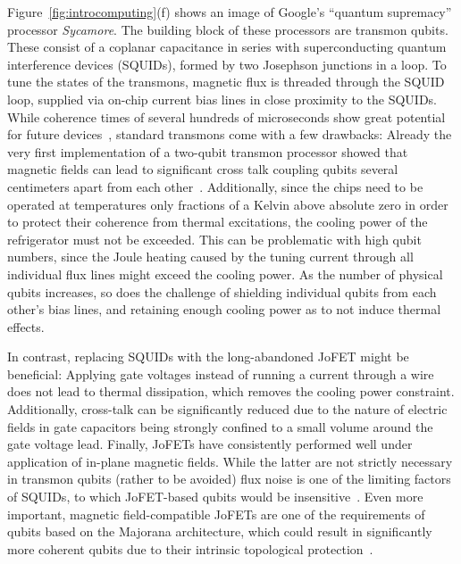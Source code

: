 Figure~\ref{fig:introcomputing}(f) shows an image of Google's \enquote{quantum supremacy} processor \textit{Sycamore}.
%
The building block of these processors are transmon qubits.
%
These consist of a coplanar capacitance in series with superconducting quantum interference devices (SQUIDs), formed by two Josephson junctions in a loop.
%
To tune the states of the transmons, magnetic flux is threaded through the SQUID loop, supplied via on-chip current bias lines in close proximity to the SQUIDs.
%
While coherence times of several hundreds of microseconds show great potential for future devices~\cite{placeNewMaterialPlatform2020}, standard transmons come with a few drawbacks:
%
Already the very first implementation of a two-qubit transmon processor showed that magnetic fields can lead to significant cross talk coupling qubits several centimeters apart from each other~\cite{dicarloDemonstrationTwoqubitAlgorithms2009}.
%
Additionally, since the chips need to be operated at temperatures only fractions of a Kelvin above absolute zero in order to protect their coherence from thermal excitations, the cooling power of the refrigerator must not be exceeded.
%
This can be problematic with high qubit numbers, since the Joule heating caused by the tuning current through all individual flux lines might exceed the cooling power.
%
As the number of physical qubits increases, so does the challenge of shielding individual qubits from each other's bias lines, and retaining enough cooling power as to not induce thermal effects.

In contrast, replacing SQUIDs with the long-abandoned JoFET might be beneficial:
%
Applying gate voltages instead of running a current through a wire does not lead to thermal dissipation, which removes the cooling power constraint.
%
Additionally, cross-talk can be significantly reduced due to the nature of electric fields in gate capacitors being strongly confined to a small volume around the gate voltage lead.
%
Finally, JoFETs have consistently performed well under application of in-plane magnetic fields.
%
While the latter are not strictly necessary in transmon qubits (rather to be avoided) flux noise is one of the limiting factors of SQUIDs, to which JoFET-based qubits would be insensitive~\cite{casparisSuperconductingGatemonQubit2018}.
%
Even more important, magnetic field-compatible JoFETs are one of the requirements of qubits based on the Majorana architecture, which could result in significantly more coherent qubits due to their intrinsic topological protection~\cite{hyartFluxcontrolledQuantumComputation2013}.


